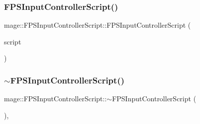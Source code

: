 \hypertarget{classmage_1_1_f_p_s_input_controller_script_ad6919f0f67c16499ac467d400f96a4b5}{}\label{classmage_1_1_f_p_s_input_controller_script_ad6919f0f67c16499ac467d400f96a4b5} 
\subsubsection{\texorpdfstring{F\+P\+S\+Input\+Controller\+Script()}{FPSInputControllerScript()}\hspace{0.1cm}{\footnotesize\ttfamily [3/3]}}
{\footnotesize\ttfamily mage\+::\+F\+P\+S\+Input\+Controller\+Script\+::\+F\+P\+S\+Input\+Controller\+Script (\begin{DoxyParamCaption}\item[{\hyperlink{classmage_1_1_f_p_s_input_controller_script}{F\+P\+S\+Input\+Controller\+Script} \&\&}]{script }\end{DoxyParamCaption})\hspace{0.3cm}{\ttfamily [default]}}

\hypertarget{classmage_1_1_f_p_s_input_controller_script_aab7082be73c735e0977e9efbbca72d98}{}\label{classmage_1_1_f_p_s_input_controller_script_aab7082be73c735e0977e9efbbca72d98} 
\subsubsection{\texorpdfstring{$\sim$\+F\+P\+S\+Input\+Controller\+Script()}{~FPSInputControllerScript()}}
{\footnotesize\ttfamily mage\+::\+F\+P\+S\+Input\+Controller\+Script\+::$\sim$\+F\+P\+S\+Input\+Controller\+Script (\begin{DoxyParamCaption}{ }\end{DoxyParamCaption})\hspace{0.3cm}{\ttfamily [virtual]}, {\ttfamily [default]}}



